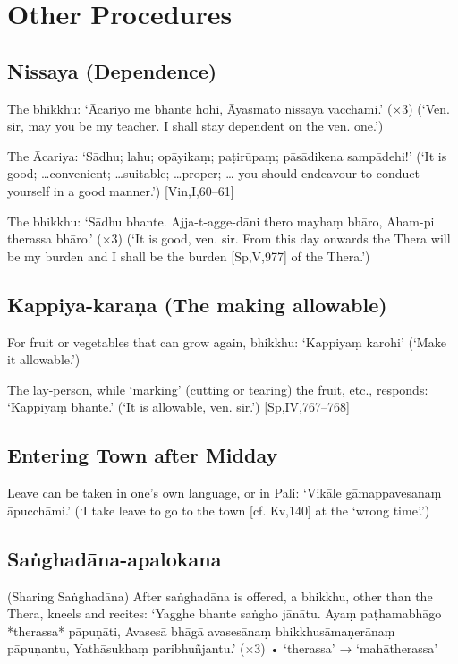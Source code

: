 \chapter{Other Procedures}

\section{Nissaya (Dependence)}

The bhikkhu:
‘Ācariyo me bhante hohi,
Āyasmato nissāya vacchāmi.’ (×3)
(‘Ven. sir, may you be my teacher.
I shall stay dependent on the ven. one.’)

The Ācariya:
‘Sādhu; lahu; opāyikaṃ; paṭirūpaṃ;
pāsādikena sampādehi!’
(‘It is good; …convenient; …suitable; …proper; …
you should endeavour to conduct yourself in a good
manner.’)
[Vin,I,60–61]

The bhikkhu:
‘Sādhu bhante.
Ajja-t-agge-dāni thero mayhaṃ bhāro,
Aham-pi therassa bhāro.’ (×3)
(‘It is good, ven. sir. From this day onwards the
Thera will be my burden and I shall be the burden
[Sp,V,977]
of the Thera.’)

\section{Kappiya-karaṇa (The making allowable)}

For fruit or vegetables that can grow again,
bhikkhu:
‘Kappiyaṃ karohi’
(‘Make it allowable.’)

The lay-person, while ‘marking’ (cutting or
tearing) the fruit, etc., responds:
‘Kappiyaṃ bhante.’
(‘It is allowable, ven. sir.’)
[Sp,IV,767–768]

\section{Entering Town after Midday}

Leave can be taken in one’s own language, or
in Pali:
‘Vikāle gāmappavesanaṃ āpucchāmi.’
(‘I take leave to go to the town
[cf. Kv,140]
at the ‘wrong time’.’)

\section{Saṅghadāna-apalokana}

(Sharing Saṅghadāna)
After saṅghadāna is offered, a bhikkhu, other
than the Thera, kneels and recites:
‘Yagghe bhante saṅgho jānātu.
Ayaṃ paṭhamabhāgo *therassa* pāpuṇāti,
Avasesā bhāgā avasesānaṃ
bhikkhusāmaṇerānaṃ pāpuṇantu,
Yathāsukhaṃ paribhuñjantu.’ (×3)
• ‘therassa’ → ‘mahātherassa’

